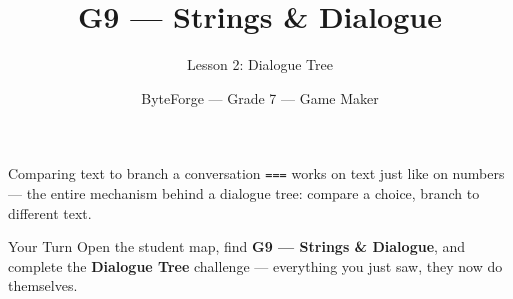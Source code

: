\documentclass[aspectratio=169]{beamer}
\title{G9 — Strings \& Dialogue}
\subtitle{Lesson 2: Dialogue Tree}
\author{ByteForge --- Grade 7 --- Game Maker}
\date{}
\begin{document}
\begin{frame}
    \titlepage
\end{frame}

\begin{frame}{Comparing text to branch a conversation}
    \Large
    \texttt{===} works on text just like on numbers — the entire mechanism behind a dialogue tree: compare a choice, branch to different text.

    \begin{center}
    \end{center}
\end{frame}

\begin{frame}{Your Turn}
    \Large
    Open the student map, find \textbf{G9 — Strings \& Dialogue}, and complete
    the \textbf{Dialogue Tree} challenge --- everything you just saw, they now do themselves.
\end{frame}
\end{document}
